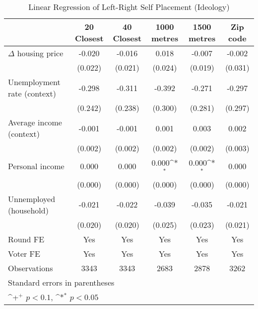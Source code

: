 \begin{table}[htbp]\centering
\def\sym#1{\ifmmode^{#1}\else\(^{#1}\)\fi}
\caption{Linear Regression of Left-Right Self Placement (Ideology)} \footnotesize \label{lrscale}
\begin{tabular}{l*{5}{c}}
\hline\hline
                    &\multicolumn{1}{c}{20 Closest}&\multicolumn{1}{c}{40 Closest}&\multicolumn{1}{c}{1000 metres}&\multicolumn{1}{c}{1500 metres}&\multicolumn{1}{c}{Zip code}\\
\hline
$\Delta$ housing price&      -0.020       &      -0.016       &       0.018       &      -0.007       &      -0.002       \\
                    &     (0.022)       &     (0.021)       &     (0.024)       &     (0.019)       &     (0.031)       \\
[1em]
Unemployment rate (context)&      -0.298       &      -0.311       &      -0.392       &      -0.271       &      -0.297       \\
                    &     (0.242)       &     (0.238)       &     (0.300)       &     (0.281)       &     (0.297)       \\
[1em]
Average income (context)&      -0.001       &      -0.001       &       0.001       &       0.003       &       0.002       \\
                    &     (0.002)       &     (0.002)       &     (0.002)       &     (0.002)       &     (0.003)       \\
[1em]
Personal income     &       0.000       &       0.000       &       0.000\sym{*}&       0.000\sym{*}&       0.000       \\
                    &     (0.000)       &     (0.000)       &     (0.000)       &     (0.000)       &     (0.000)       \\
[1em]
Unnemployed (household)&      -0.021       &      -0.022       &      -0.039       &      -0.035       &      -0.021       \\
                    &     (0.020)       &     (0.020)       &     (0.025)       &     (0.023)       &     (0.021)       \\
[1em]
\hline  Round FE    &         Yes       &         Yes       &         Yes       &         Yes       &         Yes       \\
[1em]
Voter FE            &         Yes       &         Yes       &         Yes       &         Yes       &         Yes       \\
\hline
Observations        &        3343       &        3343       &        2683       &        2878       &        3262       \\
\hline\hline
\multicolumn{6}{l}{\footnotesize Standard errors in parentheses}\\
\multicolumn{6}{l}{\footnotesize \sym{+} \(p<0.1\), \sym{*} \(p<0.05\)}\\
\end{tabular}
\end{table}
